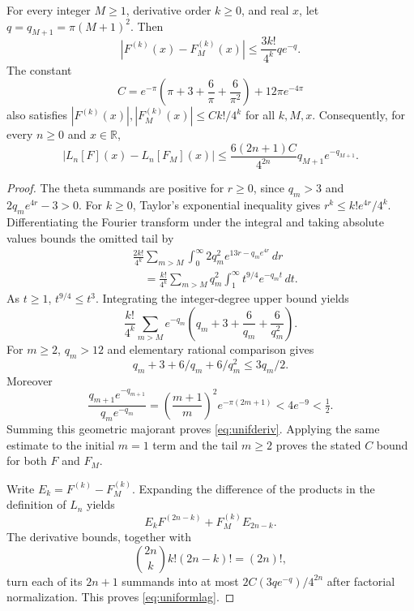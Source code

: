 \begin{theorem}
\label{thm:uniformFourier}
For every integer $M\ge1$, derivative order $k\ge0$,
and real $x$, let $q=q_{M+1}=\pi(M+1)^2$. Then
\begin{equation}
\boxed{\left|F^{(k)}(x)-F_M^{(k)}(x)\right|
\le \frac{3k!}{4^k}q e^{-q}.}
\label{eq:unifderiv}
\end{equation}
The constant
\[
C=e^{-\pi}
\left(\pi+3+\frac6\pi+\frac6{\pi^2}\right)
+12\pi e^{-4\pi}
\]
also satisfies
$|F^{(k)}(x)|,|F_M^{(k)}(x)|
\le Ck!/4^k$ for all $k,M,x$.
Consequently, for every $n\ge0$ and $x\in\mathbb R$,
\begin{equation}
\boxed{\left|L_n[F](x)-L_n[F_M](x)\right|
\le
\frac{6(2n+1)C}{4^{2n}}
q_{M+1}e^{-q_{M+1}}.}
\label{eq:uniformlag}
\end{equation}
\end{theorem}
\begin{proof}
The theta summands are positive for $r\ge0$, since
$q_m>3$ and $2q_me^{4r}-3>0$.
For $k\ge0$, Taylor's exponential inequality gives
$r^k\le k!e^{4r}/4^k$.
Differentiating the Fourier transform under the
integral and taking absolute values bounds the
omitted tail by
\begin{align*}
&\frac{2k!}{4^k}
\sum_{m>M}\int_0^\infty
2q_m^2e^{13r-q_me^{4r}}\,dr\\
&\quad=\frac{k!}{4^k}
\sum_{m>M}q_m^2
\int_1^\infty t^{9/4}e^{-q_m t}\,dt.
\end{align*}
As $t\ge1$, $t^{9/4}\le t^3$.
Integrating the integer-degree upper bound yields
\begin{equation}
\frac{k!}{4^k}\sum_{m>M}e^{-q_m}
\left(q_m+3+\frac6{q_m}+\frac6{q_m^2}\right).
\label{eq:tailterm}
\end{equation}
For $m\ge2$, $q_m>12$ and elementary
rational comparison gives
\[
q_m+3+6/q_m+6/q_m^2\le 3q_m/2.
\]
Moreover
\[
\frac{q_{m+1}e^{-q_{m+1}}}
{q_me^{-q_m}}
=\left(\frac{m+1}{m}\right)^2
e^{-\pi(2m+1)}
<4e^{-9}<\tfrac12.
\]
Summing this geometric majorant proves
\eqref{eq:unifderiv}. Applying the same
estimate to the initial $m=1$ term and the
tail $m\ge2$ proves the stated $C$ bound
for both $F$ and $F_M$.

Write $E_k=F^{(k)}-F_M^{(k)}$.
Expanding the difference of the products in
the definition of $L_n$ yields
\[
E_kF^{(2n-k)}
+F_M^{(k)}E_{2n-k}.
\]
The derivative bounds, together with
\[
\binom{2n}{k}k!(2n-k)!=(2n)!,
\]
turn each of its $2n+1$ summands into at most
$2C(3q e^{-q})/4^{2n}$ after factorial
normalization. This proves \eqref{eq:uniformlag}.
\end{proof}

